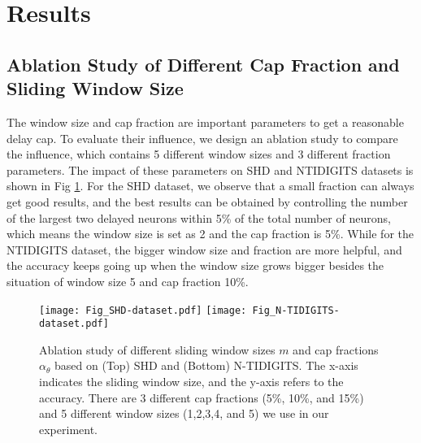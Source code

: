 \documentclass{article}
\begin{document}
\section{Results}\label{4}
\subsection{Ablation Study of Different Cap Fraction and Sliding Window Size}
The window size and cap fraction are important parameters to get a reasonable delay cap. To evaluate their influence, we design an ablation study to compare the influence, which contains 5 different window sizes and 3 different fraction parameters. The impact of these parameters on SHD and NTIDIGITS datasets is shown in Fig \ref{fig:timewindow}. For the SHD dataset, we observe that a small fraction can always get good results, and 
the best results can be obtained by controlling the number of the largest two delayed neurons within 5\% of the total number of neurons, which means the window size is set as 2 and the cap fraction is 5\%.  While for the NTIDIGITS dataset, the bigger window size and fraction are more helpful, and the accuracy keeps going up when the window size grows bigger besides the situation of window size 5 and cap fraction 10\%. 

\begin{figure}

\centering\vspace{-0.00cm}
\texttt{[image: Fig\_SHD-dataset.pdf]}\vspace{0.2cm}
    \texttt{[image: Fig\_N-TIDIGITS-dataset.pdf]}
	\caption{Ablation study of different sliding window sizes $m$ and cap fractions $\alpha_{\theta}$ based on (Top) SHD  and (Bottom) N-TIDIGITS. The x-axis indicates the sliding window size, and the y-axis refers to the accuracy. There are 3 different cap fractions  (5\%, 10\%, and 15\%) and 5 different window sizes (1,2,3,4, and 5) we use in our experiment.}\vspace{-0.0cm}
\label{fig:timewindow}
\end{figure}
\end{document}
